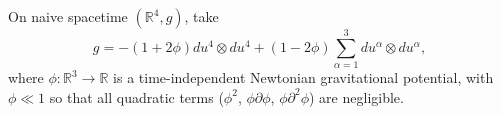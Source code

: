 On naive spacetime $(\mathbb{R}^4, g)$, take
$$g = -(1 + 2\phi) du^4 \otimes du^4 + (1 - 2\phi) \sum_{\alpha=1}^{3} du^\alpha \otimes du^\alpha,$$
where $\phi: \mathbb{R}^3 \to \mathbb{R}$ is a time-independent Newtonian gravitational potential, with $\phi \ll 1$ so that all quadratic terms ($\phi^2$, $\phi \partial \phi$, $\phi \partial^2 \phi$) are negligible.
